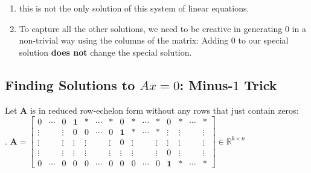 \begin{enumerate}
    \item this is not the only solution of this system of linear equations.
    \hfill \cite{mfml/book/mml/Deisenroth-Faisal-Ong}

    \item To capture all the other solutions, we need to be creative in generating $0$ in a non-trivial way using the columns of the matrix: Adding $0$ to our special solution \textbf{does not} change the special solution. 
    \hfill \cite{mfml/book/mml/Deisenroth-Faisal-Ong}

    
\end{enumerate}




\subsection{Finding Solutions to $Ax=0$: Minus-$1$ Trick \cite{mfml/book/mml/Deisenroth-Faisal-Ong}}

Let $\bm{A}$ is in reduced row-echelon form without any rows that just contain zeros:\\
.\hfill
$
    \bm{A}
    = 
    \begin{bmatrix}
        0 & \cdots & 0 & \mathbf{1} & * & \cdots & * & 0 & * & \cdots & * & 0 & * & \cdots & * \\
        \vdots & & \vdots & 0 & 0 & \cdots & 0 & \mathbf{1} & * & \cdots & * & \vdots & \vdots & & \vdots\\
        \vdots & & \vdots & \vdots & \vdots &  & \vdots & 0 & \vdots & & \vdots & \vdots & \vdots & & \vdots\\
        \vdots & & \vdots & \vdots & \vdots &  & \vdots & \vdots & \vdots & & \vdots & 0 & \vdots & & \vdots\\
        0 & \cdots & 0 & 0 & 0 & \cdots & 0 & 0 & 0 & \cdots & 0 & \mathbf{1} & * & \cdots & *
    \end{bmatrix}
    \in \mathbb{R}^{k\times n}
$
\hfill \cite{mfml/book/mml/Deisenroth-Faisal-Ong}

\vspace{0.2cm}

